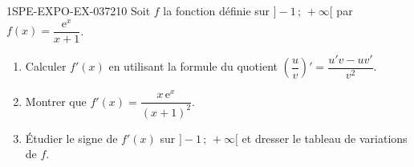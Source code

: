 \begin{exercice}{1SPE-EXPO-EX-037}{2}{10}
Soit $f$ la fonction définie sur $]-1\,;\,+\infty[$ par $f(x) = \dfrac{\mathrm{e}^{x}}{x+1}$.
\begin{enumerate}
\item Calculer $f'(x)$ en utilisant la formule du quotient $\left(\dfrac{u}{v}\right)' = \dfrac{u'v - uv'}{v^2}$.
\item Montrer que $f'(x) = \dfrac{x\,\mathrm{e}^{x}}{(x+1)^2}$.
\item Étudier le signe de $f'(x)$ sur $]-1\,;\,+\infty[$ et dresser le tableau de variations de $f$.
\end{enumerate}
\end{exercice}
